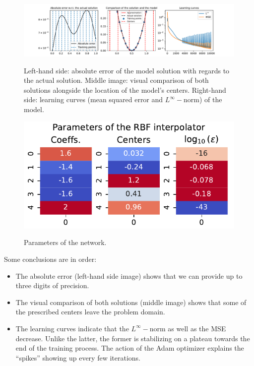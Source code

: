 \documentclass[12pt]{report} %
\begin{document}
\begin{figure}[ht]
  \hspace*{-2cm}
  {\includegraphics[width=1.25\textwidth, trim={2cm 0 2.5cm 0}, clip=true]
  {imagenes/experiments/1d/ode/ode_report.pdf}}
  \caption{Left-hand side: absolute error of the model solution with regards to the actual
  solution. Middle image: visual comparison of both solutions alongside the location of the 
  model's centers.
  Right-hand side: learning curves (mean squared error and $L^\infty-$norm) of the model.}
  \label{fig:solution-ode-1d}
\end{figure}

\begin{figure}
  \caption{Parameters of the network.\label{fig-parameters-ode-1d}}
  {\includegraphics[width=\textwidth]{imagenes/experiments/1d/ode/parameters_of_rbf_interpolator.pdf}}
  \end{figure} 

Some conclusions are in order:
\begin{itemize}
  \item The absolute error (left-hand side image) shows that we can provide up to three digits
  of precision.
  \item The visual comparison of both solutions (middle image) shows that 
  some of the prescribed centers leave the problem domain.
  \item The learning curves indicate that the $L^\infty-$norm as well as the MSE decrease.
  Unlike the latter, the former is stabilizing on a plateau towards the end of the training process. 
  The action of the Adam optimizer explains the ``spikes'' showing up every few iterations.
\end{itemize}
\end{document}
